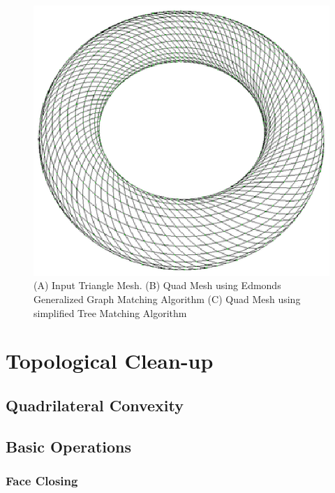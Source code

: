 \documentclass[11pt, a4paper]{paper}
\begin{document}
\begin{figure}
\includegraphics[scale=0.33]{torus3.eps}
\caption { (A) Input Triangle Mesh. (B) Quad Mesh using Edmonds Generalized
Graph Matching Algorithm (C) Quad Mesh using simplified Tree Matching Algorithm }
\end{figure}


\section { Topological Clean-up}
\subsection{ Quadrilateral Convexity }
\subsection{ Basic Operations}
\subsubsection{ Face Closing }
\end{document}
